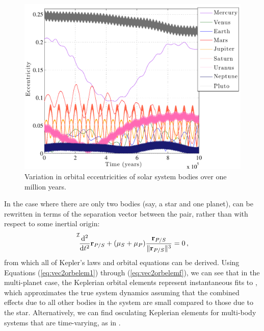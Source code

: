 \begin{figure}[ht]
 \center
 \includegraphics[width=6in]{./figures/eccenVar}
  \caption[Eccentricity variation]{ \label{fig:eccenVar} Variation in orbital eccentricities of solar system bodies over one million years.}
\end{figure}
In the case where there are only two bodies (say, a star and one planet),  can be rewritten in terms of the separation vector between the pair, rather than with respect to some inertial origin:
\begin{equation}\label{eq:twoBody}
\fdddt{I}{\mf r_{P/S}} + (\mu_S + \mu_P) \frac{\mf r_{P/S}}{\Vert\mf r_{P/S}\Vert^3} = 0 \,,
\end{equation}
from which all of Kepler's laws and orbital equations can be derived.  Using Equations (\ref{eq:vec2orbelem1}) through (\ref{eq:vec2orbelemf}), we can see that in the multi-planet case, the Keplerian orbital elements represent instantaneous fits to , which approximates the true system dynamics assuming that the combined effects due to all other bodies in the system are small compared to those due to the star.  Alternatively, we can find osculating Keplerian elements for multi-body systems that are time-varying, as in .
 
